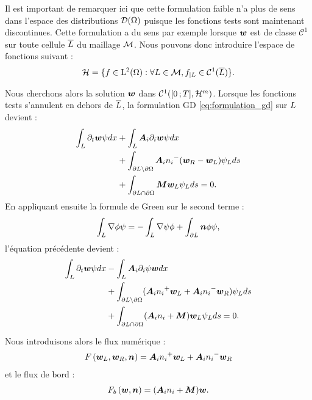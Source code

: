 Il est important de remarquer ici que cette formulation faible n’a plus de
sens dans l’espace des distributions $\mathcal{D}(\Omega)$ puisque
les fonctions tests sont
maintenant discontinues. Cette formulation a du sens par exemple lorsque $\bm{w}$
est de classe $\mathcal{C}^1$ sur toute cellule $\overline{L}$ du maillage $\mathcal{M}$. Nous
pouvons donc introduire l’espace de fonctions suivant :
\begin{align}
	\mathcal{H} = \lbrace
		f \in \mathrm{L}^2(\Omega) :
		\forall L \in \mathcal{M},
		f_{\vert L} \in \mathcal{C}^1(\overline{L})
	\rbrace .
\end{align}

Nous cherchons alors la solution $\bm{w}$ dans $\mathcal{C}^1(\lbrack0\,;T\rbrack,\mathcal{H}^m)$.
Lorsque les fonctions tests s’annulent en dehors de $\overline{L}$, la formulation GD
\eqref{eq:formulation_gd} sur $L$ devient :
\begin{equation}
	\begin{aligned}
		\int_{L} \partial_{t} \bm{w} \psi dx 
		&+ \int_{L} {\bm{A}_{i}\partial_{i}} \bm{w} \psi dx \\
		&+ \int_{\partial L \setminus \partial\Omega}
			{\bm{A}_{i}n_{i}}^{-} (\bm{w}_R - \bm{w}_L) \psi_L ds \\
		&+ \int_{\partial L \cap \partial\Omega} \bm{M} \bm{w}_L \psi_L ds = 0
		\label{eq:formulation_gd_locale} .
	\end{aligned}
\end{equation}
En appliquant ensuite la formule de Green sur le second terme :
\begin{align}
	\int_{L} \nabla \phi \psi =
	- \int_{L} \nabla \psi \phi
	+ \int_{\partial L} \bm{n} \phi \psi
	\label{eq:formule_de_green} ,
\end{align}
l’équation précédente devient :
\begin{equation}
	\begin{aligned}
		\int_{L} \partial_{t} \bm{w} \psi dx
		&- \int_{L} {\bm{A}_{i}\partial_{i}} \psi \bm{w} dx \\
		&+ \int_{\partial L \setminus \partial\Omega}
			({\bm{A}_{i}n_{i}}^{+} \bm{w}_L + {\bm{A}_{i}n_{i}}^{-} \bm{w}_R) \psi_L ds \\
		&+ \int_{\partial L \cap \partial\Omega}
			({\bm{A}_{i}n_{i}} + \bm{M}) \bm{w}_L \psi_L ds = 0
		\label{eq:formulation_gd_green} .
	\end{aligned}
\end{equation}


Nous introduisons alors le flux numérique :
\begin{align}
	F\left(\bm{w}_L,\bm{w}_R,\bm{n}\right) = {\bm{A}_{i}n_{i}}^{+} \bm{w}_L + {\bm{A}_{i}n_{i}}^{-} \bm{w}_R
	\label{eq:flux_numerique}
\end{align}
et le flux de bord :
\begin{align}
	F_b\left(\bm{w},\bm{n}\right) = ({\bm{A}_{i}n_{i}} + \bm{M}) \bm{w}
	\label{eq:flux_bord} .
\end{align}

